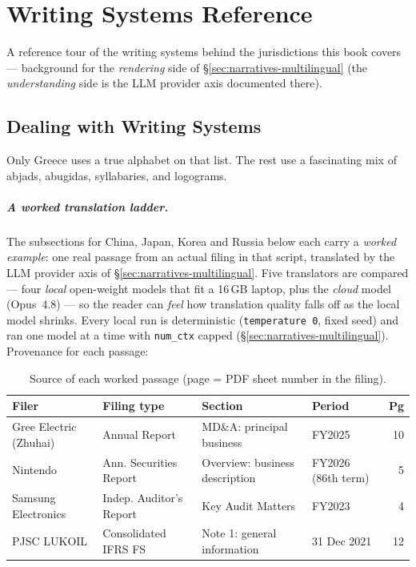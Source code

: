 \documentclass[11pt,a4paper]{report}
\begin{document}
\chapter{Writing Systems Reference}
\label{ch:writing-systems}

A reference tour of the writing systems behind the jurisdictions this book covers --- background for the
\emph{rendering} side of \S\ref{sec:narratives-multilingual} (the \emph{understanding} side is the LLM
provider axis documented there).

\section{Dealing with Writing Systems}

Only Greece uses a true alphabet on that list. The rest use a fascinating mix of abjads, abugidas, syllabaries, and logograms.

\paragraph{A worked translation ladder.} The subsections for China, Japan, Korea and Russia below each carry a
\emph{worked example}: one real passage from an actual filing in that script, translated by the LLM provider
axis of \S\ref{sec:narratives-multilingual}. Five translators are compared --- four \emph{local} open-weight
models that fit a 16\,GB laptop, plus the \emph{cloud} model (Opus~4.8) --- so the reader can \emph{feel} how
translation quality falls off as the local model shrinks. Every local run is deterministic
(\texttt{temperature\,0}, fixed seed) and ran one model at a time with \texttt{num\_ctx} capped
(\S\ref{sec:narratives-multilingual}). Provenance for each passage:

\begin{table}[h]
\centering\small
\caption{Source of each worked passage (page = PDF sheet number in the filing).}
\label{tab:ladder-provenance}
\begin{tabular}{@{}llll r@{}}
\toprule
\textbf{Filer} & \textbf{Filing type} & \textbf{Section} & \textbf{Period} & \textbf{Pg} \\
\midrule
Gree Electric (Zhuhai) & Annual Report & MD\&A: principal business & FY2025 & 10 \\
Nintendo & Ann. Securities Report & Overview: business description & FY2026 (86th term) & 5 \\
Samsung Electronics & Indep. Auditor's Report & Key Audit Matters & FY2023 & 4 \\
PJSC LUKOIL & Consolidated IFRS FS & Note 1: general information & 31 Dec 2021 & 12 \\
\bottomrule
\end{tabular}
\end{table}
\end{document}

